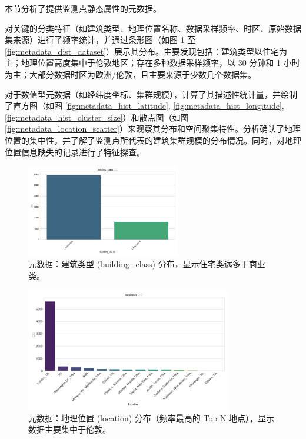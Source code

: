 \documentclass{article} %
\begin{document}
本节分析了提供监测点静态属性的元数据。

对关键的分类特征（如建筑类型、地理位置名称、数据采样频率、时区、原始数据集来源）进行了频率统计，并通过条形图（如图 \ref{fig:metadata_dist_building_class} 至 \ref{fig:metadata_dist_dataset}）展示其分布。主要发现包括：建筑类型以住宅为主；地理位置高度集中于伦敦地区；存在多种数据采样频率，以 30 分钟和 1 小时为主；大部分数据时区为欧洲/伦敦，且主要来源于少数几个数据集。

对于数值型元数据（如经纬度坐标、集群规模），计算了其描述性统计量，并绘制了直方图（如图 \ref{fig:metadata_hist_latitude}, \ref{fig:metadata_hist_longitude}, \ref{fig:metadata_hist_cluster_size}）和散点图（如图 \ref{fig:metadata_location_scatter}）来观察其分布和空间聚集特性。分析确认了地理位置的集中性，并了解了监测点所代表的建筑集群规模的分布情况。同时，对地理位置信息缺失的记录进行了特征探查。

\begin{figure}[H]
    \centering
    \includegraphics[width=0.6\textwidth]{../plots/metadata_dist_building_class.png}
    \caption{元数据：建筑类型 (building\_class) 分布，显示住宅类远多于商业类。} %
    \label{fig:metadata_dist_building_class}
\end{figure}

\begin{figure}[H]
    \centering
    \includegraphics[width=0.8\textwidth]{../plots/metadata_dist_location.png}
    \caption{元数据：地理位置 (location) 分布（频率最高的 Top N 地点），显示数据主要集中于伦敦。} %
    \label{fig:metadata_dist_location}
\end{figure}
\end{document}
